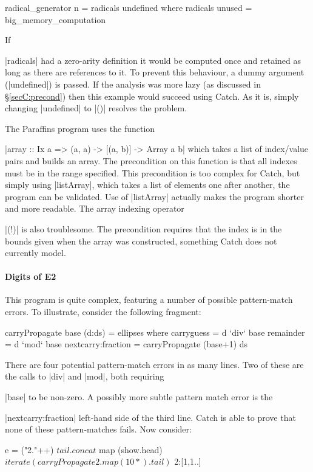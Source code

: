 \begin{code}
radical_generator n = radicals undefined
  where radicals unused = big_memory_computation
\end{code}

If \ignore|radicals| had a zero-arity definition it would be computed once and retained as long as there are references to it. To prevent this behaviour, a dummy argument (|undefined|) is passed. If the analysis was more lazy (as discussed in \S\ref{secC:precond}) then this example would succeed using Catch. As it is, simply changing |undefined| to |()| resolves the problem.

The Paraffins program uses the function \ignore|array :: Ix a => (a, a) -> [(a, b)] -> Array a b| which takes a list of index/value pairs and builds an array. The precondition on this function is that all indexes must be in the range specified. This precondition is too complex for Catch, but simply using |listArray|, which takes a list of elements one after another, the program can be validated. Use of |listArray| actually makes the program shorter and more readable. The array indexing operator \ignore|(!)| is also troublesome. The precondition requires that the index is in the bounds given when the array was constructed, something Catch does not currently model.


\paragraph{Digits of E2}

This program is quite complex, featuring a number of possible pattern-match errors. To illustrate, consider the following fragment:

\begin{code}
carryPropagate base (d:ds) = ellipses
  where  carryguess = d `div` base
         remainder = d `mod` base
         nextcarry:fraction = carryPropagate (base+1) ds
\end{code}

\noindent There are four potential pattern-match errors in as many lines. Two of these are the calls to |div| and |mod|, both requiring \ignore|base| to be non-zero. A possibly more subtle pattern match error is the \ignore|nextcarry:fraction| left-hand side of the third line. Catch is able to prove that none of these pattern-matches fails. Now consider:

\begin{code}
e =  ("2."++) $
     tail . concat $
     map (show.head) $
     iterate (carryPropagate 2 . map (10*) . tail) $
     2:[1,1..]
\end{code}

